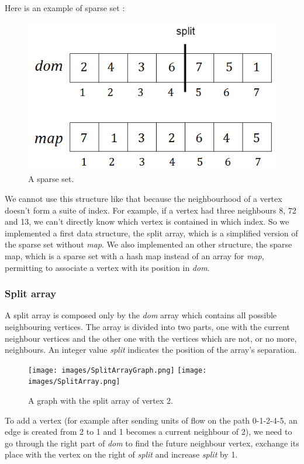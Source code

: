 Here is an example of sparse set : 
\begin{figure}[H]
\begin{center}
\includegraphics[scale=0.5]{images/sparseset.png}
\end{center}
\caption{A sparse set.}
\end{figure}
We cannot use this structure like that because the neighbourhood of a vertex doesn't form a suite of index. For example, if a vertex had three neighbours 8, 72 and 13, we can't directly know which vertex is contained in which index.
So we implemented a first data structure, the split array, which is a simplified version of the sparse set without \textit{map}. We also implemented an other structure, the sparse map, which is a sparse set with a hash map instead of an array for \textit{map}, permitting to associate a vertex with its position in \textit{dom}.





\subsubsection{Split array}
A split array is composed only by the \textit{dom} array which contains all possible neighbouring vertices. The array is divided into two parts, one with the current neighbour vertices and the other one with the vertices which are not, or no more, neighbours. An integer value \textit{split} indicates the position of the array's separation.
\begin{figure}[H]
\texttt{[image: images/SplitArrayGraph.png]}\hfill
\texttt{[image: images/SplitArray.png]}
\caption{A graph with the split array of vertex 2.}
\end{figure}
To add a vertex (for example after sending units of flow on the path 0-1-2-4-5, an edge is created from 2 to 1 and 1 becomes a current neighbour of 2), we need to go through the right part of \textit{dom} to find the future neighbour vertex, exchange its place with the vertex on the right of \textit{split} and increase \textit{split} by 1. \newline

